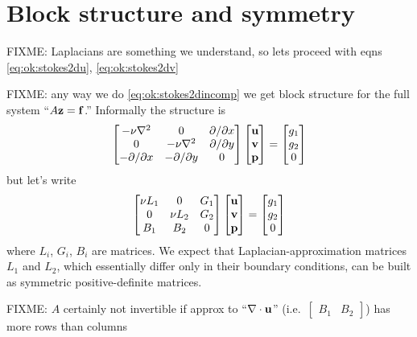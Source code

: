 \section{Block structure and symmetry}

FIXME: Laplacians are something we understand, so lets proceed with eqns \eqref{eq:ok:stokes2du}, \eqref{eq:ok:stokes2dv}

FIXME: any way we do \eqref{eq:ok:stokes2dincomp} we get block structure for the full system ``$A \mathbf{z} = \mathbf{f}$.''  Informally the structure is
  $$\begin{bmatrix}
    -\nu\nabla^2 & 0 & \partial/\partial x \\
    0 & -\nu\nabla^2 & \partial/\partial y \\
    -\partial/\partial x & -\partial/\partial y & 0
    \end{bmatrix}
    \begin{bmatrix}
    \mathbf{u} \\ \mathbf{v} \\ \mathbf{p}
    \end{bmatrix}
    =
    \begin{bmatrix}
    g_1 \\ g_2 \\ 0
    \end{bmatrix}
    $$
but let's write
  $$\begin{bmatrix}
    \nu L_1 & 0 & G_1 \\
    0 & \nu L_2 & G_2 \\
    B_1 & B_2 & 0
    \end{bmatrix}
    \begin{bmatrix}
    \mathbf{u} \\ \mathbf{v} \\ \mathbf{p}
    \end{bmatrix}
    =
    \begin{bmatrix}
    g_1 \\ g_2 \\ 0
    \end{bmatrix}
    $$
where $L_i$, $G_i$, $B_i$ are matrices.  We expect that Laplacian-approximation matrices $L_1$ and $L_2$, which essentially differ only in their boundary conditions, can be built as symmetric positive-definite matrices.

FIXME: $A$ certainly not invertible if approx to ``$\nabla\cdot \mathbf{u}$'' (i.e.~$\begin{bmatrix} B_1 & B_2 \end{bmatrix}$) has more rows than columns

